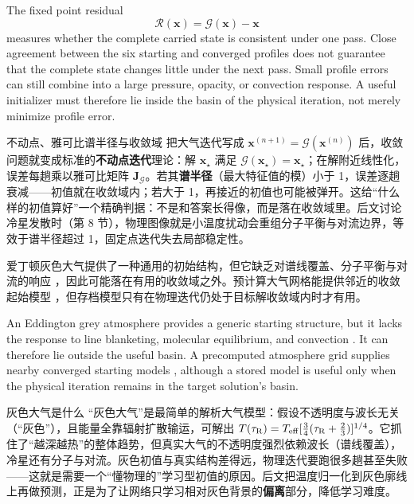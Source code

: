 \begin{EN}
The fixed point residual
\begin{equation}
\mathcal{R}(\mathbf{x})
=\mathcal{G}(\mathbf{x})-\mathbf{x}
\end{equation}
\noindent measures whether the complete carried state is consistent under one
pass. Close agreement between the six starting and converged profiles does not
guarantee that the complete state changes little under the next pass. Small
profile errors can still combine into a large pressure, opacity, or convection
response. A useful initializer must therefore lie inside the basin of the
physical iteration, not merely minimize profile error.
\end{EN}

\begin{physbox}{不动点、雅可比谱半径与收敛域}
把大气迭代写成 $\mathbf{x}^{(n+1)}=\mathcal{G}(\mathbf{x}^{(n)})$ 后，收敛问题就变成标准的\textbf{不动点迭代}理论：解 $\mathbf{x}_\star$ 满足 $\mathcal{G}(\mathbf{x}_\star)=\mathbf{x}_\star$；在解附近线性化，误差每趟乘以雅可比矩阵 $\mathbf{J}_{\mathcal{G}}$。若其\textbf{谱半径}（最大特征值的模）小于 1，误差逐趟衰减——初值就在收敛域内；若大于 1，再接近的初值也可能被弹开。这给“什么样的初值算好”一个精确判据：不是和答案长得像，而是落在收敛域里。后文讨论冷星发散时（第 8 节），物理图像就是小温度扰动会重组分子平衡与对流边界，等效于谱半径超过 1，固定点迭代失去局部稳定性。
\end{physbox}

爱丁顿灰色大气提供了一种通用的初始结构，但它缺乏对谱线覆盖、分子平衡与对流的响应 \citep{Mihalas1978,Gustafsson2008}，因此可能落在有用的收敛域之外。预计算大气网格能提供邻近的收敛起始模型 \citep{CastelliKurucz2003}，但存档模型只有在物理迭代仍处于目标解收敛域内时才有用。

\begin{EN}
An Eddington grey atmosphere provides a generic starting structure, but it
lacks the response to line blanketing, molecular equilibrium, and convection
\citep{Mihalas1978,Gustafsson2008}. It can therefore lie outside the useful
basin. A precomputed atmosphere grid supplies nearby converged starting models
\citep{CastelliKurucz2003}, although a stored model is useful only when the
physical iteration remains in the target solution's basin.
\end{EN}

\begin{physbox}{灰色大气是什么}
“灰色大气”是最简单的解析大气模型：假设不透明度与波长无关（“灰色”），且能量全靠辐射扩散输运，可解出 $T(\tau_{\rm R})=T_{\rm eff}[\frac{3}{4}(\tau_{\rm R}+\frac{2}{3})]^{1/4}$。它抓住了“越深越热”的整体趋势，但真实大气的不透明度强烈依赖波长（谱线覆盖），冷星还有分子与对流。灰色初值与真实结构差得远，物理迭代要跑很多趟甚至失败——这就是需要一个“懂物理的”学习型初值的原因。后文把温度归一化到灰色廓线上再做预测，正是为了让网络只学习相对灰色背景的\textbf{偏离}部分，降低学习难度。
\end{physbox}

